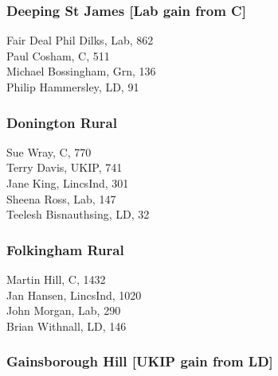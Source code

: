\documentclass[a4paper,openany,10pt]{book}
\begin{document}
\subsubsection*{Deeping St James \hspace*{\fill}\nolinebreak[1]%
\enspace\hspace*{\fill}
[Lab gain from C]}



Fair Deal Phil Dilks, Lab, 862\\
Paul Cosham, C, 511\\
Michael Bossingham, Grn, 136\\
Philip Hammersley, LD, 91\\


\subsubsection*{Donington Rural}



Sue Wray, C, 770\\
Terry Davis, UKIP, 741\\
Jane King, LincsInd, 301\\
Sheena Ross, Lab, 147\\
Teelesh Bisnauthsing, LD, 32\\


\subsubsection*{Folkingham Rural}



Martin Hill, C, 1432\\
Jan Hansen, LincsInd, 1020\\
John Morgan, Lab, 290\\
Brian Withnall, LD, 146\\


\subsubsection*{Gainsborough Hill \hspace*{\fill}\nolinebreak[1]%
\enspace\hspace*{\fill}
[UKIP gain from LD]}
\end{document}
